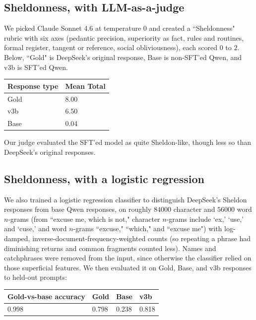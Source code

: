 \documentclass[9pt]{extarticle}
\begin{document}
\subsection{Sheldonness, with LLM-as-a-judge}

We picked Claude Sonnet 4.6 at temperature $0$ and created a ``Sheldonness" rubric with six axes (pedantic precision, superiority as fact, rules and routines, formal register, tangent or reference, social obliviousness), each scored $0$ to $2$. Below, ``Gold" is DeepSeek's original response, Base is non-SFT'ed Qwen, and v3b is SFT'ed Qwen.

\begin{table}[ht]
\centering
\begin{tabular}{|l|l|}
\hline
Response type & Mean Total \\ \hline
Gold & 8.00 \\ \hline
v3b & 6.50 \\ \hline
Base & 0.04 \\ \hline
\end{tabular}
\end{table}

Our judge evaluated the SFT'ed model as quite Sheldon-like, though less so than DeepSeek's original responses.

\subsection{Sheldonness, with a logistic regression}

We also trained a logistic regression classifier to distinguish DeepSeek's Sheldon responses from base Qwen responses, on roughly $84000$ character and $56000$ word $n$-grams (from ``excuse me, which is not," character $n$-grams include `ex,' `use,' and `cuse,' and word $n$-grams ``excuse," ``which," and ``excuse me") with log-damped, inverse-document-frequency-weighted counts (so repeating a phrase had diminishing returns and common fragments counted less). Names and catchphrases were removed from the input, since otherwise the classifier relied on those superficial features. We then evaluated it on Gold, Base, and v3b responses to held-out prompts:

\begin{table}[ht]
\centering
\begin{tabular}{|l|l|l|l|}
\hline
Gold-vs-base accuracy & Gold & Base & v3b \\ \hline
0.998 & 0.798 & 0.238 & 0.818 \\ \hline
\end{tabular}
\end{table}
\end{document}
